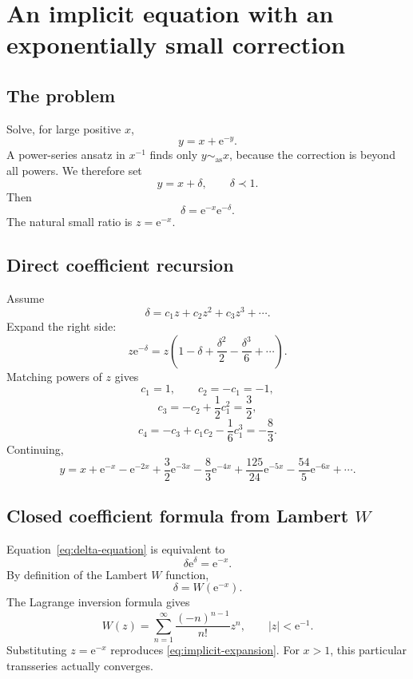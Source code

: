 \documentclass[11pt,oneside]{book}
\theoremstyle{definition}
\theoremstyle{remark}
\newcommand{\asympseries}{\sim_{\!\mathrm{as}}}
\newcommand{\e}{\mathrm{e}}
\newcommand{\precdom}{\prec}
\begin{document}
\chapter{An implicit equation with an exponentially small correction}
\label{ch:implicit-exp}

\section{The problem}

Solve, for large positive $x$,
\begin{equation}
  y=x+\e^{-y}.
  \label{eq:implicit-exp-main}
\end{equation}
A power-series ansatz in $x^{-1}$ finds only $y\asympseries x$, because the
correction is beyond all powers. We therefore set
\[
  y=x+\delta,
  \qquad \delta\precdom1.
\]
Then
\begin{equation}
  \delta=\e^{-x}\e^{-\delta}.
  \label{eq:delta-equation}
\end{equation}
The natural small ratio is $z=\e^{-x}$.

\section{Direct coefficient recursion}

Assume
\[
  \delta=c_1z+c_2z^2+c_3z^3+\cdots.
\]
Expand the right side:
\[
  z\e^{-\delta}
  =z\left(1-\delta+\frac{\delta^2}{2}
  -\frac{\delta^3}{6}+\cdots\right).
\]
Matching powers of $z$ gives
\[
 c_1=1,
 \qquad c_2=-c_1=-1,
\]
\[
 c_3=-c_2+\frac12c_1^2=\frac32,
\]
\[
 c_4=-c_3+c_1c_2-\frac16c_1^3=-\frac83.
\]
Continuing,
\begin{equation}
  y=x+\e^{-x}-\e^{-2x}+\frac32\e^{-3x}
  -\frac83\e^{-4x}+\frac{125}{24}\e^{-5x}
  -\frac{54}{5}\e^{-6x}+\cdots.
  \label{eq:implicit-expansion}
\end{equation}

\section{Closed coefficient formula from Lambert \texorpdfstring{$W$}{W}}

Equation~\eqref{eq:delta-equation} is equivalent to
\[
  \delta\e^{\delta}=\e^{-x}.
\]
By definition of the Lambert $W$ function,
\[
  \delta=W(\e^{-x}).
\]
The Lagrange inversion formula gives
\begin{equation}
  W(z)=\sum_{n=1}^{\infty}
  \frac{(-n)^{n-1}}{n!}z^n,
  \qquad |z|<\e^{-1}.
  \label{eq:lambert-small-series}
\end{equation}
Substituting $z=\e^{-x}$ reproduces
\eqref{eq:implicit-expansion}. For $x>1$, this particular transseries actually
converges.
\end{document}
